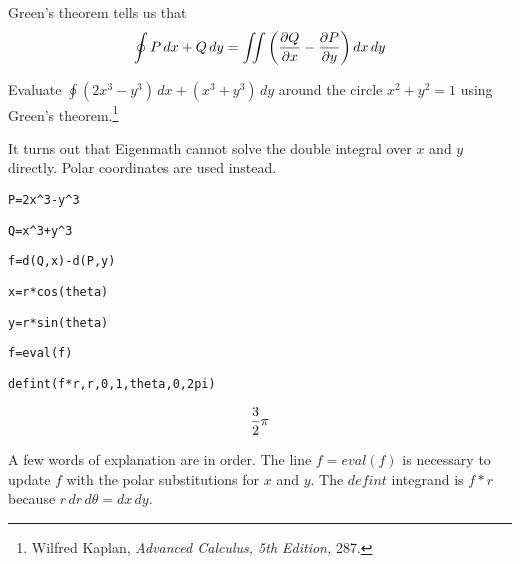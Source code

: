 
\noindent
Green's theorem tells us that
$$\oint P\,dx+Q\,dy=\int\!\!\!\int
\left({\partial Q\over\partial x}-{\partial P\over\partial y}\right)
dx\,dy$$

\noindent
Evaluate $\oint (2x^3-y^3)\,dx+(x^3+y^3)\,dy$ around the circle
$x^2+y^2=1$ using Green's theorem.\footnote{
Wilfred Kaplan, {\it Advanced Calculus, 5th Edition,} 287.}

\medskip
\noindent
It turns out that Eigenmath cannot solve the double integral over
$x$ and $y$ directly.
Polar coordinates are used instead.

\medskip
\verb$P=2x^3-y^3$

\verb$Q=x^3+y^3$

\verb$f=d(Q,x)-d(P,y)$

\verb$x=r*cos(theta)$

\verb$y=r*sin(theta)$

\verb$f=eval(f)$

\verb$defint(f*r,r,0,1,theta,0,2pi)$

$${3\over2}\pi$$

\medskip
\noindent
A few words of explanation are in order.
The line $f=eval(f)$ is necessary to update $f$ with the polar
substitutions for
$x$ and $y$.
The $defint$ integrand is $f{*}r$ because $r\,dr\,d\theta=dx\,dy$.

